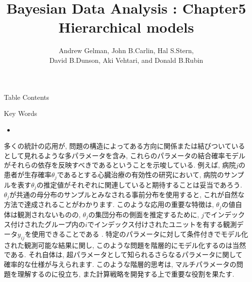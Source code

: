 \documentclass[10pt,dvipdfmx,a4]{beamer}
\title{Bayesian Data Analysis : Chapter5 \\Hierarchical models}
\subtitle{Andrew Gelman, John B.Carlin, Hal S.Stern,\\David B.Dunson, Aki Vehtari, and Donald B.Rubin}
\begin{document}
\frame{\titlepage}

\begin{frame}{Table Contents}
\begin{multicols}{2}
{\scriptsize \tableofcontents}
\end{multicols}
\end{frame}

\begin{frame}{Key Words}
\begin{multicols}{2}
{\scriptsize \begin{itemize}
\item 
\end{itemize}}
\end{multicols}
\end{frame}


\begin{frame}
多くの統計の応用が, 問題の構造によってある方向に関係または結びついているとして見れるような多パラメータを含み, これらのパラメータの結合確率モデルがそれらの依存を反映すべきであるということを示唆している.
例えば, 病院$j$の患者が生存確率$\theta_j$であるとする心臓治療の有効性の研究において, 病院のサンプルを表す$\theta_j$の推定値がそれぞれに関連していると期待することは妥当であろう.
$\theta_j$が共通の母分布のサンプルとみなされる事前分布を使用すると, これが自然な方法で達成されることがわかります.
このような応用の重要な特徴は, $\theta_j$の値自体は観測されないものの, $\theta_j$の集団分布の側面を推定するために, $j$でインデックス付けされたグループ内の$i$でインデックス付けされたユニットを有する観測データ$y_{ij}$を使用できることである .
特定のパラメータに対して条件付きでモデル化された観測可能な結果に関し, このような問題を階層的にモデル化するのは当然である.
それ自体は, 超パラメータとして知られるさらなるパラメータに関して確率的な仕様が与えられます.
このような階層的思考は, マルチパラメータの問題を理解するのに役立ち, また計算戦略を開発する上で重要な役割を果たす.
\end{frame}

\end{document}
